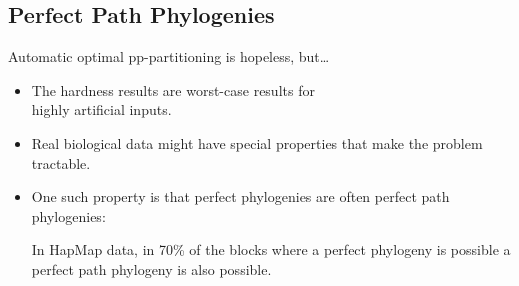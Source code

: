 \documentclass{beamer}
\begin{document}
\subsection{Perfect Path Phylogenies}

\begin{frame}{Automatic optimal pp-partitioning is hopeless, but\dots}
  \begin{itemize}
  \item The hardness results are \alert{worst-case} results for\\
    \alert{highly artificial inputs}.
  \item \alert{Real biological data} might have special properties
    that make the problem \alert{tractable}.
  \item One such property is that perfect phylogenies are often
    perfect \alert{path} phylogenies:

    In HapMap data, in 70\% of the blocks where a perfect phylogeny
    is possible a perfect path phylogeny is also possible.
  \end{itemize}  
\end{frame}
\end{document}
